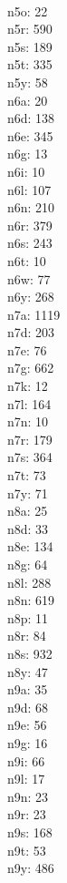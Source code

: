 \begin{multicols}{8}
  \\ n5o: 22
  \\ n5r: 590
  \\ n5s: 189
  \\ n5t: 335
  \\ n5y: 58
  \\ n6a: 20
  \\ n6d: 138
  \\ n6e: 345
  \\ n6g: 13
  \\ n6i: 10
  \\ n6l: 107
  \\ n6n: 210
  \\ n6r: 379
  \\ n6s: 243
  \\ n6t: 10
  \\ n6w: 77
  \\ n6y: 268
  \\ n7a: 1119
  \\ n7d: 203
  \\ n7e: 76
  \\ n7g: 662
  \\ n7k: 12
  \\ n7l: 164
  \\ n7n: 10
  \\ n7r: 179
  \\ n7s: 364
  \\ n7t: 73
  \\ n7y: 71
  \\ n8a: 25
  \\ n8d: 33
  \\ n8e: 134
  \\ n8g: 64
  \\ n8l: 288
  \\ n8n: 619
  \\ n8p: 11
  \\ n8r: 84
  \\ n8s: 932
  \\ n8y: 47
  \\ n9a: 35
  \\ n9d: 68
  \\ n9e: 56
  \\ n9g: 16
  \\ n9i: 66
  \\ n9l: 17
  \\ n9n: 23
  \\ n9r: 23
  \\ n9s: 168
  \\ n9t: 53
  \\ n9y: 486

\end{multicols}
